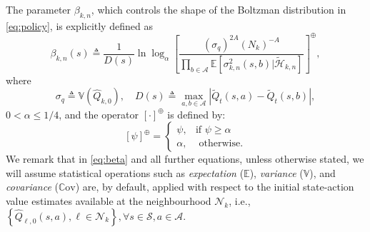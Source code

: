 \documentclass[lettersize,journal]{IEEEtran}
\begin{document}
\par 
The parameter $\beta_{k,n}$, which controls  the shape of the Boltzman distribution in \eqref{eq:policy}, is explicitly defined as 
 \begin{equation}
\label{eq:beta}
  \beta_{k,n}(s) \triangleq \frac{1}{D(s)}\ln \log_{\alpha}\left[\frac{(\sigma_q)^{2A}(N_k)^{-A}}{\prod \limits_{b\in \mathcal{A}} \mathbb{E} \left[\sigma_{k,n}^2(s,b)|\widetilde{\mathcal{H}}_{k,n}\right ]}\right]^{\oplus},
\end{equation} 
where 
\begin{equation}
   \sigma_q\triangleq\mathbb{V}(\widehat{Q}_{k,0}), \quad D(s) \triangleq \max \limits_{a,b\in \mathcal{A}}\left|\widetilde{Q}_{t}\left(s,a\right)-\widetilde{Q}_{t}(s, b)\right|,
\end{equation}
$0 < \alpha \leq 1/4$, and the operator $[\cdot]^{\oplus}$ is defined by:
    \[ [\psi]^{\oplus}=
   \begin{cases} 
      \psi, & \text{if }\psi\geq \alpha\\
      \alpha, & \text{ otherwise}. 
   \end{cases}
\]
We remark that in \eqref{eq:beta} and all further equations, unless otherwise stated, we will assume statistical operations such as \textit{expectation} ($\mathbb{E}$), \textit{variance} ($\mathbb{V}$), and \textit{covariance} ($\mathbb{C}\mathrm{ov}$) are, by default,  applied with respect to the initial state-action value estimates available at the neighbourhood $\mathcal{N}_k$, i.e., $\left\{\widehat{Q}_{\ell,0}(s,a),\ell\in \mathcal{N}_k \right\}, \forall s\in \mathcal{S}, a\in \mathcal{A}$.\par 
\end{document}
